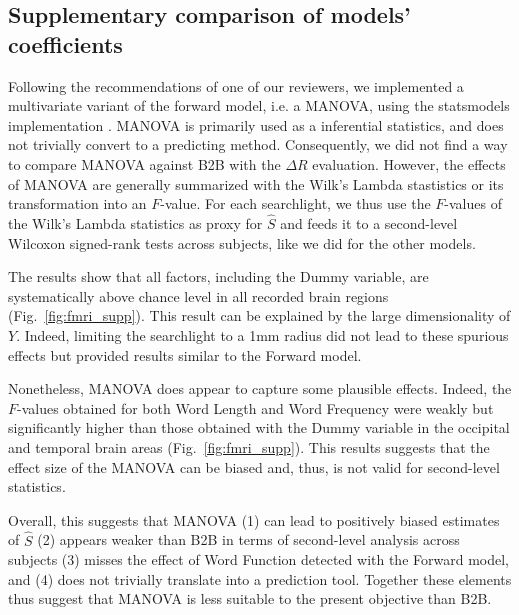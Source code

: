 \subsection{Supplementary comparison of models' coefficients}

Following the recommendations of one of our reviewers, we implemented a
multivariate variant of the forward model, i.e. a MANOVA, using the statsmodels
implementation \citep{seabold2010statsmodels}. MANOVA is primarily used as a
inferential statistics, and does not trivially convert to a predicting method.
Consequently, we did not find a way to compare MANOVA against B2B with the
$\Delta R$ evaluation. However, the effects of MANOVA are generally summarized
with the Wilk's Lambda stastistics or its transformation into an $F$-value.
For each searchlight, we thus use the $F$-values of the
Wilk's Lambda statistics as proxy for $\hat S$ and feeds it to a second-level
Wilcoxon signed-rank tests across subjects, like we did for the other models.

The results show that all factors, including the Dummy variable, are
systematically above chance level in all recorded brain regions (Fig.~\ref{fig:fmri_supp}). This result
can be explained by the large dimensionality of $Y$. Indeed, limiting the
searchlight to a 1mm radius did not lead to these spurious effects but provided
results similar to the Forward model.

Nonetheless, MANOVA does appear to capture some plausible effects. Indeed, the
$F$-values obtained for both Word Length and Word Frequency were weakly but
significantly higher than those obtained with the Dummy variable in the
occipital and temporal brain areas (Fig.~\ref{fig:fmri_supp}). This results
suggests that the effect size of the MANOVA can be biased and, thus, is not
valid for second-level statistics.

Overall, this suggests that MANOVA (1) can lead to positively biased estimates of
$\hat S$ (2) appears weaker than B2B in terms of second-level analysis across
subjects (3) misses the effect of Word Function detected with the Forward model,
and (4) does not trivially translate into a prediction tool. Together these
elements thus suggest that MANOVA is less suitable to the present objective than
B2B.


